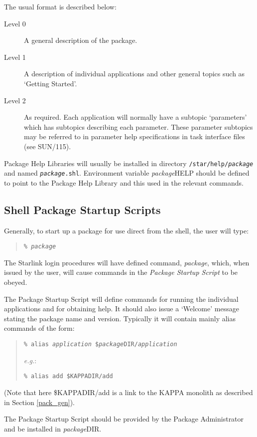 \documentclass[twoside,11pt]{article}
\newcommand{\xref}[3]{#1}
\newcommand{\xlabel}[1]{}
\renewcommand{\_}{\texttt{\symbol{95}}}
\begin{document}
The usual format is described below:
\begin{description}
\item[Level 0] A general description of the package.
\item[Level 1] A description of individual applications and other general 
topics such as `Getting Started'.
\item[Level 2] As required. Each application will normally have a 
subtopic `parameters' which has subtopics describing each parameter. 
These parameter subtopics may be referred to in parameter help
specifications in task interface files (see 
\xref{SUN/115}{sun115}{}).
\end{description}
Package Help Libraries will usually be installed in directory 
\texttt{/star/help/\textit{package}} and named \texttt{\textit{package}.shl}.
Environment variable \textit{package}\_HELP should be defined to point to the 
Package Help Library and this used in the relevant commands.

\subsection{\xlabel{shell_package_startup_scripts}Shell Package Startup Scripts}
Generally, to start up a package for use direct from the shell, the 
user will type:
\begin{quote}
\texttt{\% \textit{package}}
\end{quote}
The Starlink login procedures will have defined command, \textit{package}, which, 
when issued by the user, will cause commands in the \textit{Package Startup 
Script} to be obeyed. 

The Package Startup Script will define commands for 
running the individual applications and for obtaining help. 
It should also issue a `Welcome' message stating the package name and version.
Typically it will contain mainly alias commands of the form:
\begin{quote}
\texttt{\% alias 
\textit{application} \$\textit{package}\_DIR/\textit{application}}

\textit{e.g.}:

\texttt{\% alias add \$KAPPA\_DIR/add}
\end{quote}
(Note that here \$KAPPA\_DIR/add is a link to the KAPPA monolith as described
in Section \ref{pack_gen}).

The Package Startup Script should be provided by the Package Administrator and
be installed in \textit{package}\_DIR.
\end{document}
